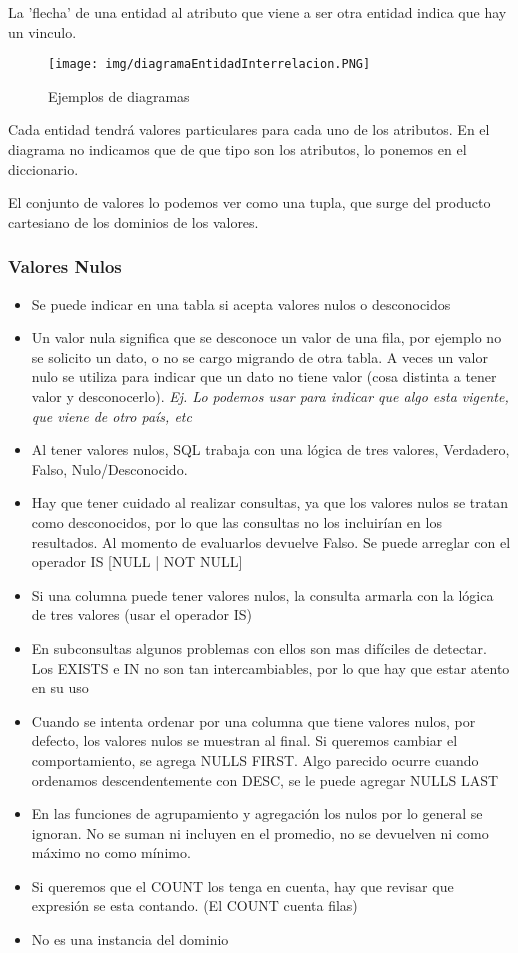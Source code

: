 La 'flecha' de una entidad al atributo que viene a ser otra entidad indica que hay un vinculo.

\begin{figure}[!htb]
    \centering
    \texttt{[image: img/diagramaEntidadInterrelacion.PNG]}
    \caption{Ejemplos de diagramas}
\end{figure}

Cada entidad tendrá valores particulares para cada uno de los atributos. En el diagrama no indicamos que de que tipo son los atributos, lo ponemos en el diccionario.

El conjunto de valores lo podemos ver como una tupla, que surge del producto cartesiano de los dominios de los valores.

\subsubsection*{Valores Nulos}
\begin{itemize}
\item Se puede indicar en una tabla si acepta valores nulos o desconocidos
\item Un valor nula significa que se desconoce un valor de una fila,  por ejemplo no se solicito un dato, o no se cargo migrando de otra tabla. A veces un valor nulo se utiliza para indicar que un dato no tiene valor (cosa distinta a tener valor y desconocerlo). \textit{Ej. Lo podemos usar para indicar que algo esta vigente, que viene de otro país, etc}
\item Al tener valores nulos, SQL trabaja con una lógica de tres valores, Verdadero, Falso, Nulo/Desconocido.  
\item Hay que tener cuidado al realizar consultas, ya que los valores nulos se tratan como desconocidos, por lo que las consultas no los incluirían en los resultados. Al momento de evaluarlos devuelve Falso. Se puede arreglar con el operador IS [NULL | NOT NULL]
\item  Si una columna puede tener valores nulos, la consulta armarla con la lógica de tres valores (usar el operador IS)
\item  En subconsultas algunos problemas con ellos son mas difíciles de detectar. Los EXISTS e IN no son tan intercambiables, por lo que hay que estar atento en su uso
\item Cuando se intenta ordenar por una columna que tiene valores nulos, por defecto, los valores nulos se muestran al final. Si queremos cambiar el comportamiento, se agrega NULLS FIRST. Algo parecido ocurre cuando ordenamos descendentemente con DESC, se le puede agregar NULLS LAST
\item En las funciones de agrupamiento y agregación los nulos por lo general se ignoran. No se suman ni incluyen en el promedio, no se devuelven ni como máximo no como mínimo.
\item Si queremos que el COUNT los tenga en cuenta, hay que revisar que expresión se esta contando. (El COUNT cuenta filas)
\item No es una instancia del dominio
\end{itemize}

